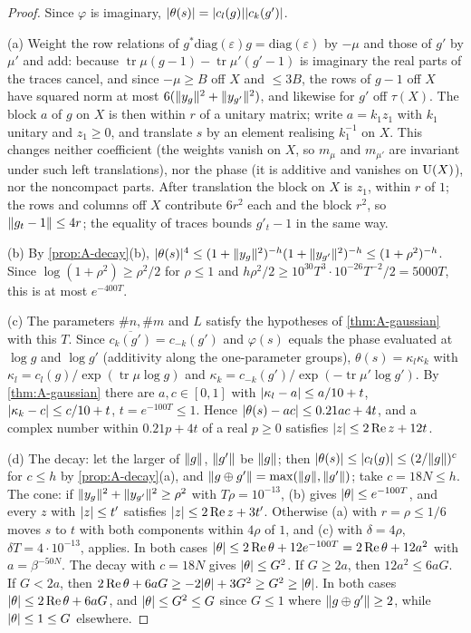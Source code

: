 \begin{proof}
Since $\varphi$ is imaginary, $\lvert \theta(s)\rvert=\lvert c_l(g)\rvert\lvert c_k(g')\rvert$.

(a) Weight the row relations of $g^*\mathrm{diag}(\varepsilon)g=\mathrm{diag}(\varepsilon)$ by $-\mu$ and those of $g'$ by $\mu'$ and add: because $\operatorname{tr}\mu(g-1)-\operatorname{tr}\mu'(g'-1)$ is imaginary the real parts of the traces cancel, and since $-\mu\ge B$ off $X$ and $\le3B$, the rows of
$g-1$ off $X$ have squared norm at most $6(\lVert y_g\rVert^2+\lVert y_{g'}\rVert^2)$, and likewise for $g'$ off $\tau(X)$. The block $a$ of $g$ on $X$ is then within $r$ of a unitary matrix; write $a=k_1z_1$ with $k_1$ unitary and $z_1\ge0$, and translate $s$ by an
element realising $k_1^{-1}$ on $X$. This changes neither coefficient (the weights vanish on $X$, so $m_\mu$ and $m_{\mu'}$ are invariant under such left translations), nor the phase (it is additive and vanishes on $\operatorname{U}(X)$), nor the noncompact
parts. After translation the block on $X$ is $z_1$, within $r$ of $1$; the rows and columns off $X$ contribute $6r^2$ each and the block $r^2$, so $\lVert g_t-1\rVert\le4r$; the equality of traces bounds $g'_t-1$ in the same way.

(b) By \cref{prop:A-decay}(b), $\lvert \theta(s)\rvert^4\le(1+\lVert y_g\rVert^2)^{-h}(1+\lVert y_{g'}\rVert^2)^{-h}\le(1+\rho^2)^{-h}$. Since $\log(1+\rho^2)\ge\rho^2/2$ for $\rho\le1$ and $h\rho^2/2\ge10^{30}T^3\cdot10^{-26}T^{-2}/2=5000T$, this is at most $e^{-400T}$.

(c) The parameters $\#n,\#m$ and $L$ satisfy the hypotheses of \cref{thm:A-gaussian} with this $T$. Since $\overline{c_k(g')}=c_{-k}(g')$ and $\varphi(s)$ equals the phase evaluated at $\log g$ and $\log g'$ (additivity along the one-parameter groups),
$\theta(s)=\kappa_l\kappa_k$ with $\kappa_l=c_l(g)/\exp(\operatorname{tr}\mu\log g)$ and $\kappa_k=c_{-k}(g')/\exp(-\operatorname{tr}\mu'\log g')$. By \cref{thm:A-gaussian} there are $a,c\in[0,1]$ with $\lvert \kappa_l-a\rvert\le a/10+t$, $\lvert \kappa_k-c\rvert\le c/10+t$, $t=e^{-100T}\le1$. Hence
$\lvert \theta(s)-ac\rvert\le0.21ac+4t$, and a complex number within $0.21p+4t$ of a real $p\ge0$ satisfies $\lvert z\rvert\le2\operatorname{Re} z+12t$.

(d) The decay: let the larger of $\lVert g\rVert$, $\lVert g'\rVert$ be $\lVert g\rVert$; then $\lvert \theta(s)\rvert\le\lvert c_l(g)\rvert\le(2/\lVert g\rVert)^{c}$ for $c\le h$ by \cref{prop:A-decay}(a), and $\lVert g\oplus g'\rVert=\max(\lVert g\rVert,\lVert g'\rVert)$; take $c=18N\le h$. The cone: if $\lVert y_g\rVert^2+\lVert y_{g'}\rVert^2\ge\rho^2$ with $T\rho=10^{-13}$, (b) gives
$\lvert \theta\rvert\le e^{-100T}$, and every $z$ with $\lvert z\rvert\le t'$ satisfies $\lvert z\rvert\le2\operatorname{Re} z+3t'$. Otherwise (a) with $r=\rho\le1/6$ moves $s$ to $t$ with both components within $4\rho$ of $1$, and (c) with $\delta=4\rho$, $\delta T=4\cdot10^{-13}$, applies. In both
cases $\lvert \theta\rvert\le2\operatorname{Re}\theta+12e^{-100T}=2\operatorname{Re}\theta+12a^2$ with $a=\beta^{-50N}$. The decay with $c=18N$ gives $\lvert \theta\rvert\le G^2$. If $G\ge2a$, then $12a^2\le6aG$. If $G<2a$, then $2\operatorname{Re}\theta+6aG\ge-2\lvert \theta\rvert+3G^2\ge G^2\ge\lvert \theta\rvert$. In both cases
$\lvert \theta\rvert\le2\operatorname{Re}\theta+6aG$, and $\lvert \theta\rvert\le G^2\le G$ since $G\le1$ where $\lVert g\oplus g'\rVert\ge2$, while $\lvert \theta\rvert\le1\le G$ elsewhere.


\end{proof}
